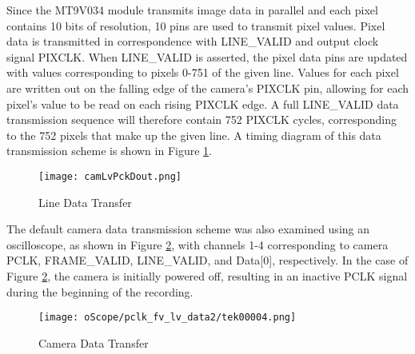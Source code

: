 \par
Since the MT9V034 module transmits image data in parallel and each pixel contains 10 bits of resolution, 10 pins are used to transmit pixel values. Pixel data is transmitted in correspondence with LINE\_VALID and output clock signal PIXCLK. When LINE\_VALID is asserted, the pixel data pins are updated with values corresponding to pixels 0-751 of the given line. Values for each pixel are written out on the falling edge of the camera's PIXCLK pin, allowing for each pixel's value to be read on each rising PIXCLK edge. A full LINE\_VALID data transmission sequence will therefore contain 752 PIXCLK cycles, corresponding to the 752 pixels that make up the given line. A timing diagram of this data transmission scheme is shown in Figure \ref{LvDout}.  
\begin{figure}[H]
	\centerline{\texttt{[image: camLvPckDout.png]}}
	\caption{Line Data Transfer \cite{mt9v034}}
	\label{LvDout}
\end{figure}

\par
The default camera data transmission scheme was also examined using an oscilloscope, as shown in Figure \ref{camDataTransfer}, with channels 1-4 corresponding to camera PCLK, FRAME\_VALID, LINE\_VALID, and Data[0], respectively. In the case of Figure \ref{camDataTransfer}, the camera is initially powered off, resulting in an inactive PCLK signal during the beginning of the recording.
\begin{figure}[H]
	\centerline{\texttt{[image: oScope/pclk\_fv\_lv\_data2/tek00004.png]}}
	\caption{Camera Data Transfer}
	\label{camDataTransfer}
\end{figure}

